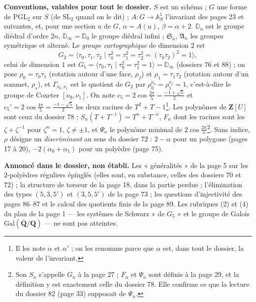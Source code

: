 \documentclass[11pt,a4paper]{article}
\begin{document}
\textbf{Conventions, valables pour tout le dossier.} $S$ est un schéma ; $G$
une forme de $\mathrm{PGL}_2$ sur $S$ (de $\mathrm{SL}_2$ quand on le dit) ;
$A : G \to \mathbb{A}^1_S$ l'invariant des pages 23 et suivantes, et, pour une
section $u$ de $G$, $\alpha = A(u)$, $\beta = \alpha + 2$. $\mathbb{D}_n$ est
le groupe diédral d'ordre $2n$, $\mathbb{D}_\infty = \mathbb{D}_0$ le groupe
diédral infini ; $\mathfrak{S}_n$, $\mathfrak{A}_n$ les groupes symétrique et
alterné. Le \emph{groupe cartographique} de dimension $2$ est
\[
  G_2 = \langle \tau_0, \tau_1, \tau_2 \mid \tau_0^2 = \tau_1^2 = \tau_2^2 =
  (\tau_0\tau_2)^2 = 1 \rangle ,
\]
celui de dimension $1$ est $G_1 = \langle \tau_0, \tau_1 \mid \tau_0^2 =
\tau_1^2 = 1\rangle = \mathbb{D}_\infty$ (dossiers 76 et 88) ; on pose
$\rho_0 = \tau_0\tau_1$ (rotation autour d'une face, $\rho_f$) et $\rho_1 =
\tau_1\tau_2$ (rotation autour d'un sommet, $\rho_s$), et
$\Gamma_{\nu_0,\nu_1}$ est le quotient de $G_2$ par $\rho_0^{\nu_0} =
\rho_1^{\nu_1} = 1$, c'est-à-dire le groupe de Coxeter $[\nu_0, \nu_1]$.
On note $c_5 = 2\cos\frac{2\pi}{5} = \frac{-1 + \sqrt5}{2}$ et $c_5' =
2\cos\frac{4\pi}{5} = \frac{-1 - \sqrt5}{2}$ les deux racines de $T^2 + T -
1$\footnote{Il les note $\alpha$ et $\alpha'$ ; on les renomme parce que
$\alpha$ est, dans tout le dossier, la valeur de l'invariant.}. Les
polynômes de $\mathbf{Z}[U]$ sont ceux du dossier 78 : $S_n(T + T^{-1}) =
T^n + T^{-n}$, $F_n$ dont les racines sont les $\zeta + \zeta^{-1}$ pour
$\zeta^n = 1$, $\zeta \neq \pm1$, et $\Psi_n$ le polynôme minimal de
$2\cos\frac{2\pi}{n}$\footnote{Son $S_n$ s'appelle $G_n$ à la page 27 ;
$F_n$ et $\Psi_n$ sont définis à la page 29, et la définition y est
exactement celle du dossier 78. Elle confirme ce que la lecture du
dossier 82 (page 33) supposait de $\Psi_n$.}. Sans indice, $\rho$ désigne un
\emph{discriminant} au sens du dossier 72 : $2 - \alpha$ pour un polygone
(pages 17 à 20), $-2(\alpha_0 + \alpha_1)$ pour un polyèdre (page 75).

\textbf{Annoncé dans le dossier, non établi.} Les « généralités » de
la page 5 sur les $2$-polyèdres réguliers épinglés (elles sont, en substance,
celles des dossiers 70 et 72) ; la structure de torseur de la page 18, dans
la partie perdue ; l'élimination des types $(5, 3, 5')$ et $(3, 5, 5')$ de la
page 73 ; les questions d'injectivité des pages 86--87 et le calcul des
quotients finis de la page 89. Les rubriques (2) et (4) du plan de la page 1
--- les systèmes de Schwarz « de $G_5$ » et le groupe de Galois
$\mathrm{Gal}(\overline{\mathbf{Q}}/\mathbf{Q})$ --- ne sont pas atteintes.
\end{document}
